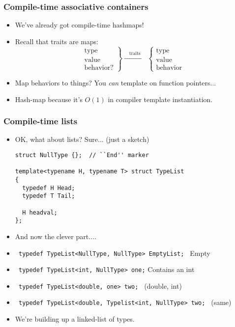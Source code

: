 \begin{frame}[fragile,t]
\frametitle{Compile-time associative containers}
\begin{itemize}[<+->]
\item We've already got compile-time hashmaps!
\item Recall that traits are maps:
\[
\left.
 \begin{matrix}
        \mathrm{type} \\
        \mathrm{value} \\
        \mathrm{behavior?}
\end{matrix}
\right\}
 \xrightarrow{\quad\mathrm{traits}\quad}%
    \left\{
      \begin{matrix}
        \mathrm{type} \\
        \mathrm{value} \\
        \mathrm{behavior}
        \end{matrix}
      \right.
\]
\vskip 12pt
\item Map behaviors to things?  You \emph{can} template on function pointers...

\vskip 12pt
\item Hash-map because it's $O(1)$ in compiler template instantiation.
\end{itemize}

\end{frame}

\begin{frame}[fragile,t]
\frametitle{Compile-time lists}
\begin{itemize}[<+->]
\item OK, what about lists?  Sure... (just a sketch)
{\scriptsize\begin{verbatim}
struct NullType {};  // ``End'' marker

template<typename H, typename T> struct TypeList 
{
  typedef H Head;
  typedef T Tail;

  H headval;
};
\end{verbatim}
}
\item And now the clever part....
\item {\scriptsize \texttt{ typedef TypeList<NullType, NullType> EmptyList; } }  Empty
\item {\scriptsize \texttt{ typedef TypeList<int, NullType>      one;} } Contains an int
\item {\scriptsize \texttt{ typedef TypeList<double, one> two; } } (double, int)
\item {\scriptsize \texttt{ typedef TypeList<double, Typelist<int, NullType> two; } } (same)

\vskip 12pt

\item We're building up a linked-list of types.

\end{itemize}


\end{frame}

